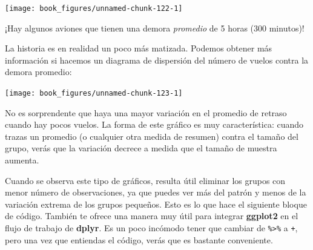 \documentclass[11pt,oneside]{report}
\newenvironment{Shaded}{\begin{snugshade}}{\end{snugshade}}
\newcommand{\DataTypeTok}[1]{\textcolor[rgb]{0.13,0.29,0.53}{#1}}
\newcommand{\DecValTok}[1]{\textcolor[rgb]{0.00,0.00,0.81}{#1}}
\newcommand{\KeywordTok}[1]{\textcolor[rgb]{0.13,0.29,0.53}{\textbf{#1}}}
\newcommand{\NormalTok}[1]{#1}
\newcommand{\OperatorTok}[1]{\textcolor[rgb]{0.81,0.36,0.00}{\textbf{#1}}}
\newcommand{\OtherTok}[1]{\textcolor[rgb]{0.56,0.35,0.01}{#1}}
\newcommand{\StringTok}[1]{\textcolor[rgb]{0.31,0.60,0.02}{#1}}
\begin{document}
\begin{center}\texttt{[image: book\_figures/unnamed-chunk-122-1]} \end{center}

¡Hay algunos aviones que tienen una demora \emph{promedio} de 5 horas
(300 minutos)!

La historia es en realidad un poco más matizada. Podemos obtener más
información si hacemos un diagrama de dispersión del número de vuelos
contra la demora promedio:

\begin{Shaded}
\end{Shaded}

\begin{center}\texttt{[image: book\_figures/unnamed-chunk-123-1]} \end{center}

No es sorprendente que haya una mayor variación en el promedio de
retraso cuando hay pocos vuelos. La forma de este gráfico es muy
característica: cuando trazas un promedio (o cualquier otra medida de
resumen) contra el tamaño del grupo, verás que la variación decrece a
medida que el tamaño de muestra aumenta.

Cuando se observa este tipo de gráficos, resulta útil eliminar los
grupos con menor número de observaciones, ya que puedes ver más del
patrón y menos de la variación extrema de los grupos pequeños. Esto es
lo que hace el siguiente bloque de código. También te ofrece una manera
muy útil para integrar \textbf{ggplot2} en el flujo de trabajo de
\textbf{dplyr}. Es un poco incómodo tener que cambiar de
\texttt{\%\textgreater{}\%} a \texttt{+}, pero una vez que entiendas el
código, verás que es bastante conveniente.
\end{document}

